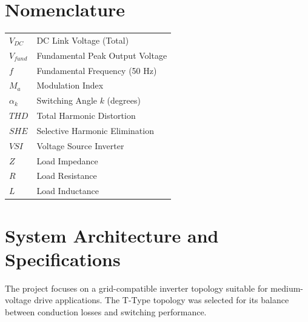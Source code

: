 \documentclass[12pt, a4paper]{article}
\begin{document}
	\begin{abstract}
		This report presents the design, mathematical modeling, and simulation of a three-phase three-level T-Type Voltage Source Inverter (VSI). The control strategy employed is Unipolar Selective Harmonic Elimination (SHE), specifically optimized to regulate the fundamental output voltage while rigorously suppressing the $5^{th}$ and $7^{th}$ harmonic orders. The system was modeled in the MATLAB/Simulink environment, incorporating a specialized gate logic algorithm to ensure stable neutral-point clamping. Simulation results demonstrate a high-fidelity output with a Current Total Harmonic Distortion (THD) of $2.98\%$, validating the efficacy of the proposed design for medium-voltage applications.
	\end{abstract}
	
	\newpage
	
	\tableofcontents
	\newpage
	\listoffigures
	\listoftables
	
	\section*{Nomenclature}
	\begin{longtable}{p{2.5cm} p{10cm}}
		$V_{DC}$ & DC Link Voltage (Total) \\
		$V_{fund}$ & Fundamental Peak Output Voltage \\
		$f$ & Fundamental Frequency (50 Hz) \\
		$M_a$ & Modulation Index \\
		$\alpha_k$ & Switching Angle $k$ (degrees) \\
		$THD$ & Total Harmonic Distortion \\
		$SHE$ & Selective Harmonic Elimination \\
		$VSI$ & Voltage Source Inverter \\
		$Z$ & Load Impedance \\
		$R$ & Load Resistance \\
		$L$ & Load Inductance \\
	\end{longtable}
	\newpage
	
	
	\section{System Architecture and Specifications}
	The project focuses on a grid-compatible inverter topology suitable for medium-voltage drive applications. The T-Type topology was selected for its balance between conduction losses and switching performance.
	
\end{document}
